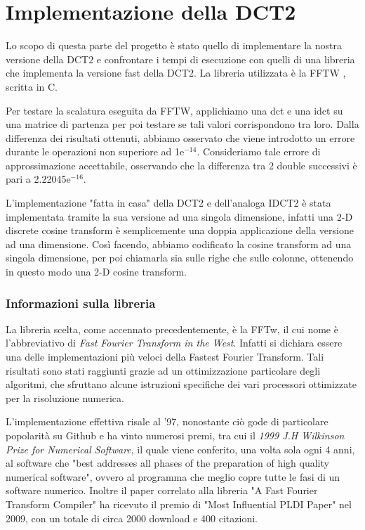 	
\part{Implementazione della DCT2}

Lo scopo di questa parte del progetto è stato quello di implementare la nostra versione della DCT2 e confrontare i tempi di esecuzione con quelli di una libreria che implementa la versione fast della DCT2. La libreria utilizzata è la FFTW \cite{fftw}, scritta in C.

Per testare la scalatura eseguita da FFTW, applichiamo una dct e una idct su una matrice di partenza per poi testare se tali valori corrispondono tra loro. Dalla differenza dei risultati ottenuti, abbiamo osservato che viene introdotto un errore durante le operazioni non superiore ad 1e$^{-14}$. Consideriamo tale errore di approssimazione accettabile, osservando che la differenza tra 2 double successivi è pari a 2.22045e$^{-16}$.

L'implementazione "fatta in casa" della DCT2 e dell'analoga IDCT2 è stata implementata tramite la sua versione ad una singola dimensione, infatti una 2-D discrete cosine transform è semplicemente una doppia applicazione della versione ad una dimensione. Così facendo, abbiamo codificato la cosine transform ad una singola dimensione, per poi chiamarla sia sulle righe che sulle colonne, ottenendo in questo modo una 2-D cosine transform.

\section{Informazioni sulla libreria}

La libreria scelta, come accennato precedentemente, è la FFTw, il cui nome è l'abbreviativo di \textit{Fast Fourier Transform in the West}. Infatti si dichiara essere una delle implementazioni più veloci della Fastest Fourier Transform. Tali risultati sono stati raggiunti grazie ad un ottimizzazione particolare degli algoritmi, che sfruttano alcune istruzioni specifiche dei vari processori ottimizzate per la risoluzione numerica.

L'implementazione effettiva risale al '97, nonostante ciò gode di particolare popolarità su Github\cite{Github} e ha vinto numerosi premi, tra cui il \textit{1999 J.H Wilkinson Prize for Numerical Software}, il quale viene conferito, una volta sola ogni 4 anni, al software che "best addresses all phases of the preparation of high quality numerical software", ovvero al programma che meglio copre tutte le fasi di un software numerico. Inoltre il paper correlato alla libreria "A Fast Fourier Transform Compiler"\cite{fftw_paper} ha ricevuto il premio di "Most Influential PLDI Paper" nel 2009, con un totale di circa 2000 download e 400 citazioni.


